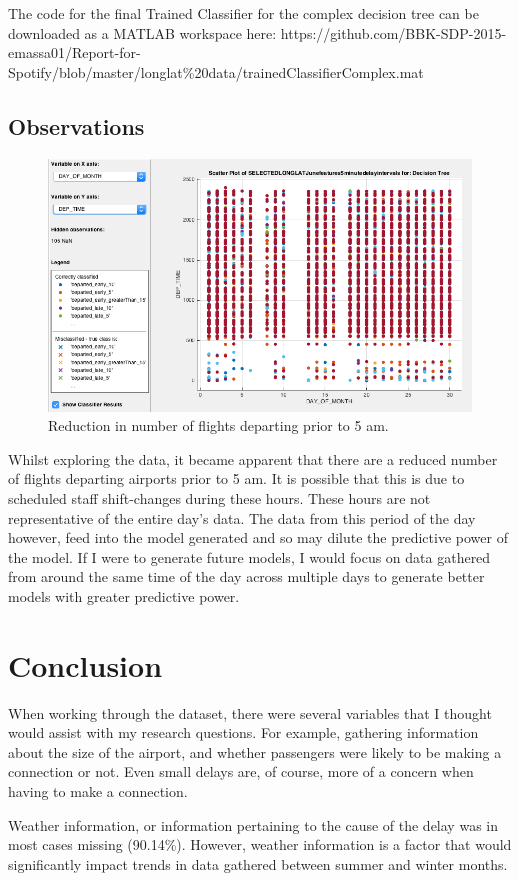 \documentclass[a4paper, 10pt]{article}
\begin{document}
\vspace{5mm}
The code for the final Trained Classifier for the complex decision tree can be downloaded as a MATLAB workspace here: https://github.com/BBK-SDP-2015-emassa01/Report-for-Spotify/blob/master/longlat\%20data/trainedClassifierComplex.mat 



\subsection{Observations}

\begin{figure}[H]
\begin{center}
\includegraphics[scale=0.45]{4am}
\caption{Reduction in number of flights departing prior to 5 am.}
\label{4am}
\end{center}
\end{figure}
Whilst exploring the data, it became apparent that there are a reduced number of flights departing airports prior to 5 am. It is possible that this is due to scheduled staff shift-changes during these hours. These hours are not representative of the entire day's data. The data from this period of the day however, feed into the model generated and so may dilute the predictive power of the model. If I were to generate future models, I would focus on data gathered from around the same time of the day across multiple days to generate better models with greater predictive power.

\section{Conclusion}
When working through the dataset, there were several variables that I thought would assist with my research questions.  For example, gathering information about the size of the airport, and whether passengers were likely to be making a connection or not. Even small delays are, of course, more of a concern when having to make a connection. 

\vspace{5mm}
Weather information, or information pertaining to the cause of the delay was in most cases missing (90.14\%). However, weather information is a factor that would significantly impact trends in data gathered between summer and winter months. 
\end{document}
